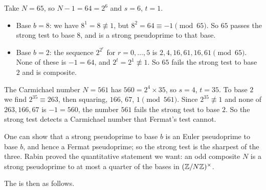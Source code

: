 \documentclass[a4paper]{scrartcl}
\begin{document}
\begin{example}
	Take $N = 65$, so $N - 1 = 64 = 2^6$ and $s = 6$, $t = 1$.
	\begin{itemize}
		\item Base $b = 8$: we have $8^1 = 8 \not\equiv1$, but $8^2 = 64 \equiv -1 \pmod{65}$. So $65$ passes the strong test to base $8$, and is a strong pseudoprime to that base.
		\item Base $b = 2$: the sequence $2^{2^r}$ for $r = 0, \dots, 5$ is $2, 4, 16, 61, 16, 61 \pmod{65}$. None of these is $-1 = 64$, and $2^t = 2^1 \not\equiv 1$. So $65$ fails the strong test to base $2$ and is composite.
	\end{itemize}
\end{example}

\begin{example}
	The Carmichael number $N = 561$ has $560 = 2^4\times35$, so $s = 4$, $t = 35$. To base $2$ we find $2^{35}\equiv263$, then squaring, $166$, $67$, $1 \pmod{561}$. Since $2^{35}\not\equiv1$ and none of $263, 166, 67$ is $-1 = 560$, the number $561$ fails the strong test to base $2$. So the strong test detects a Carmichael number that Fermat's test cannot.
\end{example}

\begin{remark}
	One can show that a strong pseudoprime to base $b$ is an Euler pseudoprime to base $b$, and hence a Fermat pseudoprime; so the strong test is the sharpest of the three. Rabin proved the quantitative statement we want: an odd composite $N$ is a strong pseudoprime to at most a quarter of the bases in $(\mathbb{Z}/N\mathbb{Z})^\times$.
\end{remark}

The  is then as follows.
\end{document}
